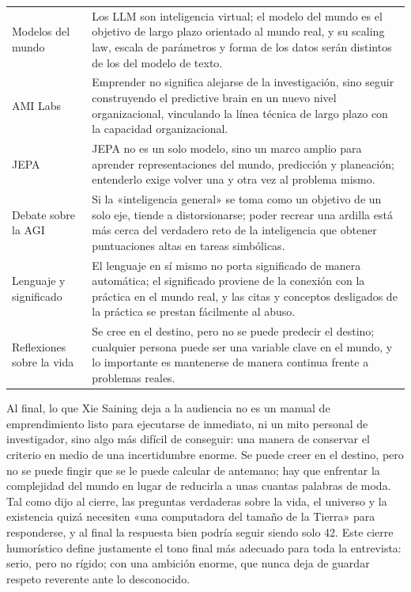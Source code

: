 \begin{longtable}{>{\raggedright\arraybackslash}p{} >{\raggedright\arraybackslash}p{}}
Modelos del mundo & Los LLM son inteligencia virtual; el modelo del mundo es el objetivo de largo plazo orientado al mundo real, y su scaling law, escala de parámetros y forma de los datos serán distintos de los del modelo de texto. \\
AMI Labs & Emprender no significa alejarse de la investigación, sino seguir construyendo el predictive brain en un nuevo nivel organizacional, vinculando la línea técnica de largo plazo con la capacidad organizacional. \\
JEPA & JEPA no es un solo modelo, sino un marco amplio para aprender representaciones del mundo, predicción y planeación; entenderlo exige volver una y otra vez al problema mismo. \\
Debate sobre la AGI & Si la «inteligencia general» se toma como un objetivo de un solo eje, tiende a distorsionarse; poder recrear una ardilla está más cerca del verdadero reto de la inteligencia que obtener puntuaciones altas en tareas simbólicas. \\
Lenguaje y significado & El lenguaje en sí mismo no porta significado de manera automática; el significado proviene de la conexión con la práctica en el mundo real, y las citas y conceptos desligados de la práctica se prestan fácilmente al abuso. \\
Reflexiones sobre la vida & Se cree en el destino, pero no se puede predecir el destino; cualquier persona puede ser una variable clave en el mundo, y lo importante es mantenerse de manera continua frente a problemas reales. \\
\bottomrule
\end{longtable}

Al final, lo que Xie Saining deja a la audiencia no es un manual de emprendimiento listo para ejecutarse de inmediato, ni un mito personal de investigador, sino algo más difícil de conseguir: una manera de conservar el criterio en medio de una incertidumbre enorme. Se puede creer en el destino, pero no se puede fingir que se le puede calcular de antemano; hay que enfrentar la complejidad del mundo en lugar de reducirla a unas cuantas palabras de moda. Tal como dijo al cierre, las preguntas verdaderas sobre la vida, el universo y la existencia quizá necesiten «una computadora del tamaño de la Tierra» para responderse, y al final la respuesta bien podría seguir siendo solo 42. Este cierre humorístico define justamente el tono final más adecuado para toda la entrevista: serio, pero no rígido; con una ambición enorme, que nunca deja de guardar respeto reverente ante lo desconocido.


